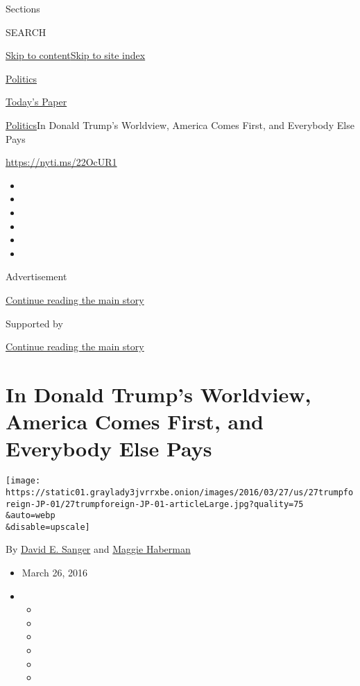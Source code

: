Sections

SEARCH

\protect\hyperlink{site-content}{Skip to
content}\protect\hyperlink{site-index}{Skip to site index}

\href{https://www.nytimes3xbfgragh.onion/section/politics}{Politics}

\href{https://myaccount.nytimes3xbfgragh.onion/auth/login?response_type=cookie\&client_id=vi}{}

\href{https://www.nytimes3xbfgragh.onion/section/todayspaper}{Today's
Paper}

\href{/section/politics}{Politics}\textbar{}In Donald Trump's Worldview,
America Comes First, and Everybody Else Pays

\url{https://nyti.ms/22OcUR1}

\begin{itemize}
\item
\item
\item
\item
\item
\item
\end{itemize}

Advertisement

\protect\hyperlink{after-top}{Continue reading the main story}

Supported by

\protect\hyperlink{after-sponsor}{Continue reading the main story}

\hypertarget{in-donald-trumps-worldview-america-comes-first-and-everybody-else-pays}{%
\section{In Donald Trump's Worldview, America Comes First, and Everybody
Else
Pays}\label{in-donald-trumps-worldview-america-comes-first-and-everybody-else-pays}}

\texttt{[image: https://static01.graylady3jvrrxbe.onion/images/2016/03/27/us/27trumpforeign-JP-01/27trumpforeign-JP-01-articleLarge.jpg?quality=75\\\&auto=webp\\\&disable=upscale]}

By \href{http://www.nytimes3xbfgragh.onion/by/david-e-sanger}{David E.
Sanger} and
\href{http://www.nytimes3xbfgragh.onion/by/maggie-haberman}{Maggie
Haberman}

\begin{itemize}
\item
  March 26, 2016
\item
  \begin{itemize}
  \item
  \item
  \item
  \item
  \item
  \item
  \end{itemize}
\end{itemize}

